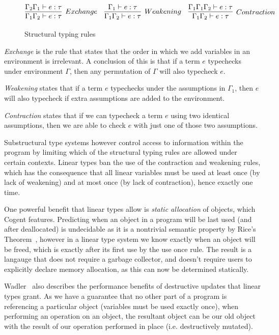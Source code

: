 \begin{figure}
    \centering
    $$
        \infer[Exchange]{
            \Gamma_1\Gamma_2 \vdash e : \tau
        }{
            \Gamma_2\Gamma_1 \vdash e : \tau
        }\quad
        \infer[Weakening]{
            \Gamma_1\Gamma_2 \vdash e : \tau
        }{
            \Gamma_1 \vdash e : \tau
        }\quad
        \infer[Contraction]{
            \Gamma_1\Gamma_2 \vdash e : \tau
        }{
            \Gamma_1\Gamma_1\Gamma_2 \vdash e : \tau
        }
    $$
    \caption{Structural typing rules}
    \label{def:structural}
\end{figure}

\textit{Exchange} is the rule that states that the order in which we add variables in an environment
is irrelevant. A conclusion of this is that if a term $e$ typechecks under environment $\Gamma$,
then any permutation of $\Gamma$ will also typecheck $e$.

\textit{Weakening} states that if a term $e$ typechecks under the assumptions
in $\Gamma_1$, then $e$ will also typecheck if extra assumptions are added to the environment.

\textit{Contraction} states that if we can typecheck a term $e$ using two identical
assumptions, then we are able to check $e$ with just one of those two assumptions.

Substructural type systems however control access to information within the program by limiting which
of the structural typing rules are allowed under certain contexts. Linear types ban the use of the
contraction and weakening rules, which has the consequence that all linear variables must be used 
at least once (by lack of weakening) and at most once (by lack of contraction), hence exactly one time.

One powerful benefit that linear types allow is \textit{static allocation} of objects, which Cogent
features. Predicting when an object in a program will be last used (and after deallocated)
is undecidable as it is a nontrivial semantic property by Rice's Theorem~\citep{Sipser},
however in a linear type system we know exactly when an object will be freed,
which is exactly after its first use by the use once rule. The result is a langauge that does
not require a garbage collector, and doesn't require users to explicitly declare memory allocation,
as this can now be determined statically.

Wadler~\cite{LinearTypesChangeTheWorld} also describes the performance benefits of destructive updates
that linear types grant. As we have a guarantee that no other part of a program is referencing a particular
object (variables must be used exactly once), when performing an operation on an object, the resultant
object can be our old object with the result of our operation performed in place (i.e. destructively
mutated).

